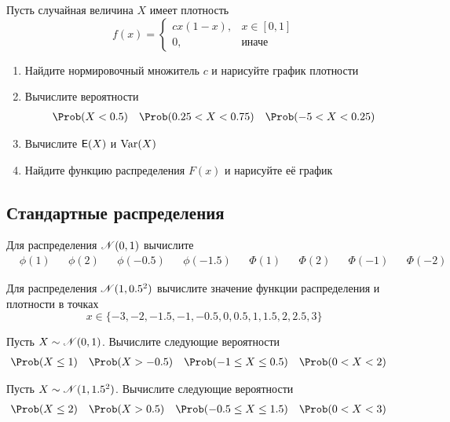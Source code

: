 \begin{exercise}
Пусть случайная величина \(X\) имеет плотность
\[
	f(x)=\begin{cases}
	cx(1-x), & x\in[0,1] \\ 0, & \text{иначе}
	\end{cases}
\]
\begin{enumerate}
	\item Найдите нормировочный множитель \(c\) и нарисуйте график плотности
	\item Вычислите вероятности
	\begin{align*}
		\Prob&(X<0.5) & \Prob&(0.25<X<0.75) & \Prob(-5<X<0.25)
	\end{align*}
	\item Вычислите \({\mathsf E}(X)\) и \(\operatorname{Var}(X)\)
	\item Найдите функцию распределения \(F(x)\) и нарисуйте её график
\end{enumerate}
\end{exercise}

\subsection{Стандартные распределения}

\begin{exercise}
Для распределения \({\mathscr N}(0,1)\) вычислите
\begin{align*}
	&\phi(1) & &\phi(2) & &\phi(-0.5) & &\phi(-1.5) & &\Phi(1) & &\Phi(2) & &\Phi(-1) & &\Phi(-2)
\end{align*}
\end{exercise}

\begin{exercise}
Для распределения \({\mathscr N}(1,0.5^2)\) вычислите значение функции распределения и плотности в точках
\[
	x\in\{-3, -2, -1.5, -1, -0.5, 0, 0.5, 1, 1.5, 2, 2.5, 3\}
\]
\end{exercise}

\begin{exercise}
Пусть \(X\sim{\mathscr N}(0,1)\). Вычислите следующие вероятности
\begin{align*}
	&\Prob(X\leq1) & &\Prob(X>-0.5) & 
	&\Prob(-1\leq X\leq0.5) & &\Prob(0<X<2)
\end{align*}
\end{exercise}

\begin{exercise}
Пусть \(X\sim{\mathscr N}(1,1.5^2)\). Вычислите следующие вероятности
\begin{align*}
	&\Prob(X\leq2) & &\Prob(X>0.5) & 
	&\Prob(-0.5\leq X\leq1.5) & &\Prob(0<X<3)
\end{align*}
\end{exercise}

